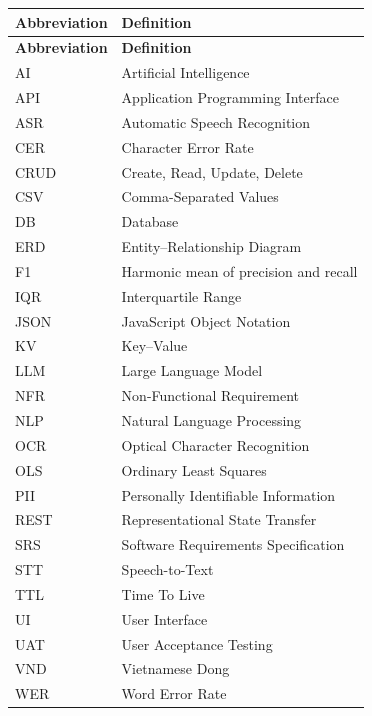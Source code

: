 
\begin{longtable}{@{}L{2.8cm}L{11.5cm}@{}}
  \toprule
  \textbf{Abbreviation} & \textbf{Definition} \\
  \midrule
  \endfirsthead
  \toprule
  \textbf{Abbreviation} & \textbf{Definition} \\
  \midrule
  \endhead
  AI & Artificial Intelligence \\
  API & Application Programming Interface \\
  ASR & Automatic Speech Recognition \\
  CER & Character Error Rate \\
  CRUD & Create, Read, Update, Delete \\
  CSV & Comma-Separated Values \\
  DB & Database \\
  ERD & Entity--Relationship Diagram \\
  F1 & Harmonic mean of precision and recall \\
  IQR & Interquartile Range \\
  JSON & JavaScript Object Notation \\
  KV & Key--Value \\
  LLM & Large Language Model \\
  NFR & Non-Functional Requirement \\
  NLP & Natural Language Processing \\
  OCR & Optical Character Recognition \\
  OLS & Ordinary Least Squares \\
  PII & Personally Identifiable Information \\
  REST & Representational State Transfer \\
  SRS & Software Requirements Specification \\
  STT & Speech-to-Text \\
  TTL & Time To Live \\
  UI & User Interface \\
  UAT & User Acceptance Testing \\
  VND & Vietnamese Dong \\
  WER & Word Error Rate \\
  \bottomrule
\end{longtable}

\setcounter{table}{0}

